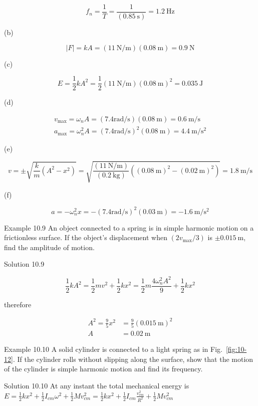 \documentclass[10pt]{article}
\numberwithin{equation}{section}
\begin{document}
$$
f_{n}=\frac{1}{T}=\frac{1}{(0.85 \mathrm{~s})}=1.2 \mathrm{~Hz}
$$

(b)

$$
|F|=k A=(11 \mathrm{~N} / \mathrm{m})(0.08 \mathrm{~m})=0.9 \mathrm{~N}
$$

(c)

$$
E=\frac{1}{2} k A^{2}=\frac{1}{2}(11 \mathrm{~N} / \mathrm{m})(0.08 \mathrm{~m})^{2}=0.035 \mathrm{~J}
$$

(d)

$$
\begin{gathered}
v_{\max }=\omega_{n} A=(7.4 \mathrm{rad} / \mathrm{s})(0.08 \mathrm{~m})=0.6 \mathrm{~m} / \mathrm{s} \\
a_{\max }=\omega_{n}^{2} A=(7.4 \mathrm{rad} / \mathrm{s})^{2}(0.08 \mathrm{~m})=4.4 \mathrm{~m} / \mathrm{s}^{2}
\end{gathered}
$$

(e)

$$
v= \pm \sqrt{\frac{k}{m}\left(A^{2}-x^{2}\right)}=\sqrt{\frac{(11 \mathrm{~N} / \mathrm{m})}{(0.2 \mathrm{~kg})}\left((0.08 \mathrm{~m})^{2}-(0.02 \mathrm{~m})^{2}\right)}=1.8 \mathrm{~m} / \mathrm{s}
$$

(f)

$$
a=-\omega_{n}^{2} x=-(7.4 \mathrm{rad} / \mathrm{s})^{2}(0.03 \mathrm{~m})=-1.6 \mathrm{~m} / \mathrm{s}^{2}
$$

Example 10.9 An object connected to a spring is in simple harmonic motion on a frictionless surface. If the object's displacement when $\left(2 v_{\max } / 3\right)$ is $\pm 0.015 \mathrm{~m}$, find the amplitude of motion.

Solution 10.9

$$
\frac{1}{2} k A^{2}=\frac{1}{2} m v^{2}+\frac{1}{2} k x^{2}=\frac{1}{2} m \frac{4 \omega_{n}^{2} A^{2}}{9}+\frac{1}{2} k x^{2}
$$

therefore

$$
\begin{aligned}
A^{2}=\frac{9}{5} x^{2} & =\frac{9}{5}(0.015 \mathrm{~m})^{2} \\
A & =0.02 \mathrm{~m}
\end{aligned}
$$

Example 10.10 A solid cylinder is connected to a light spring as in Fig.~\ref{fig:10-12}. If the cylinder rolls without slipping along the surface, show that the motion of the cylinder is simple harmonic motion and find its frequency.

Solution 10.10 At any instant the total mechanical energy is\\
$E=\frac{1}{2} k x^{2}+\frac{1}{2} I_{c m} \omega^{2}+\frac{1}{2} M v_{c m}^{2}=\frac{1}{2} k x^{2}+\frac{1}{2} I_{c m} \frac{v_{c m}^{2}}{R^{2}}+\frac{1}{2} M v_{c m}^{2}$
\end{document}
